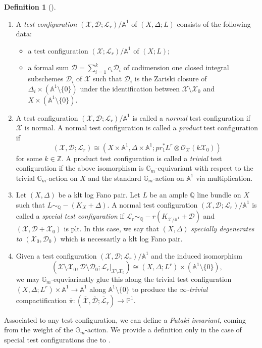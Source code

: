 \documentclass[11pt]{amsart}
\numberwithin{equation}{section}
\theoremstyle{definition}
\newtheorem{defn}[theorem]{Definition}
\newcommand{\bQ}{\mathbb{Q}}
\newcommand{\bG}{\mathbb{G}}
\newcommand{\bP}{\mathbb{P}}
\newcommand{\bA}{\mathbb{A}}
\newcommand{\cO}{\mathcal{O}}
\newcommand{\bZ}{\mathbb{Z}}
\newcommand{\cX}{\mathcal X}
\newcommand{\cL}{\mathcal L}
\begin{document}
\begin{defn}[\cite{Tian, Donaldson}]
\begin{enumerate}[label=(\alph*)]
\item A \emph{test configuration} $(\cX,\mathcal{D};\cL_r)/\bA^1$ of $(X,\Delta;L)$ consists of the following data:
\begin{itemize}
\item a test configuration $(\cX;\cL_r)/\bA^1$ of $(X;L)$;
\item a formal sum $\mathcal{D}=\sum_{i=1}^k c_i \mathcal{D}_i$ of codimension one closed integral subschemes $\mathcal{D}_i$ of $\cX$ such that $\mathcal{D}_i$ is the Zariski closure of $\Delta_i\times(\bA^1\setminus\{0\})$ under the identification between $\cX\setminus\cX_0$ and $X\times(\bA^1\setminus\{0\})$.
\end{itemize}
\item A test configuration $(\cX,\mathcal{D};\cL_r)/\bA^1$ is called a \emph{normal} test configuration if $\cX$ is normal. 
A normal test configuration is called a \emph{product} test configuration if \[
(\cX,\mathcal{D};\cL_r)\cong(X\times\bA^1,\Delta\times\bA^1;pr_1^* L^r\otimes\cO_{\cX}(k\cX_0))
\] for some $k\in\bZ$. A product test configuration is called a \emph{trivial} test configuration if the above isomorphism is $\bG_m$-equivariant with respect to the trivial $\bG_m$-action on $X$ and the standard $\bG_m$-action on $\bA^1$ via multiplication. 
\item 
Let $(X,\Delta)$ be a klt log Fano pair. Let $L$ be an ample $\bQ$ line bundle on $X$ such that $L\sim_{\bQ}-(K_X+\Delta)$. A normal test configuration $(\cX,\mathcal{D};\cL_r)/\bA^1$ is called a \emph{special test configuration} if $\cL_r\sim_{\bQ}-r(K_{\cX/\bA^1}+\mathcal{D})$ and $(\cX,\mathcal{D}+\cX_0)$ is plt. In this case, we say that $(X,\Delta)$ \emph{specially degenerates to} $(\cX_0,\mathcal{D}_0)$ which is necessarily a klt log Fano pair.
\item Given a test configuration $(\cX,\mathcal{D};\cL_r)/\bA^1$ and the induced isomorphism \[(\cX\setminus\cX_0, \mathcal{D} \setminus \mathcal{D}_0;\cL_r|_{\cX\setminus\cX_0}) \cong (X,\Delta;L^r)\times(\bA^1\setminus\{0\}),\] we may $\bG_m$-equviariantly glue this along the trivial test configuration $(X,\Delta; L^r) \times \bA^1 \to \bA^1 $ along $\bA^{1} \setminus \{ 0\}$ to produce the \textit{$\infty$-trivial} compactification $\overline{\pi}: (\overline{\cX}, \overline{\mathcal{D}}; \overline{\cL}_r) \to\bP^1$.
\end{enumerate}
\end{defn}

Associated to any test configuration, we can define a \textit{Futaki invariant}, coming from the weight of the $\bG_m$-action.  We provide a definition only in the case of special test configurations due to \cite{LX14}.  
\end{document}
